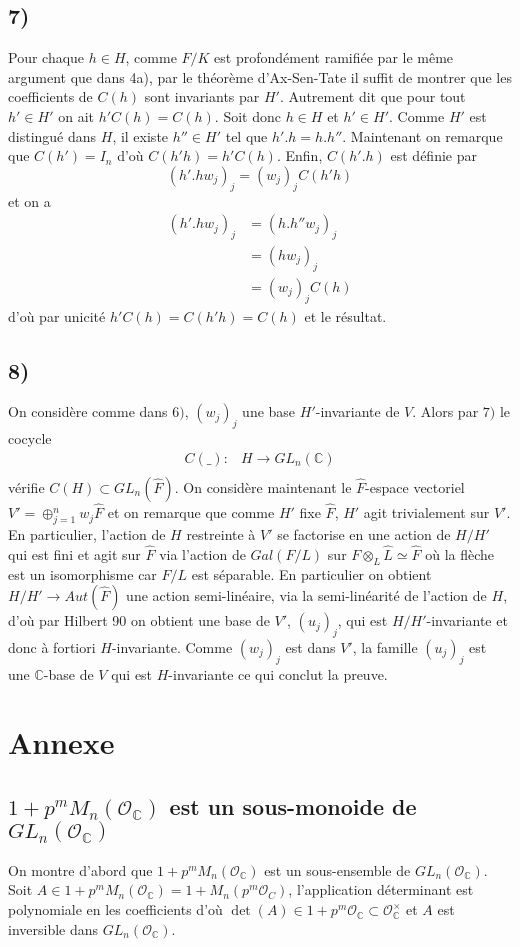 \documentclass[a4paper,12pt]{article}
\newcommand{\C}{\mathbb{C}}
\newcommand{\Or}{\mathcal{O}}
\theoremstyle{plain}
\theoremstyle{definition}
\theoremstyle{remark}
\begin{document}
\subsection*{7)}
Pour chaque $h\in H$, comme $F/K$ est profondément ramifiée par
le même argument que dans 4a), par le théorème d'Ax-Sen-Tate il
suffit de 
montrer que les coefficients de $C(h)$ sont invariants par $H'$.
Autrement dit que pour tout $h'\in H'$ on ait $h'C(h)=C(h)$. 
Soit donc $h\in H$ et $h'\in H'$. Comme $H'$ est distingué dans
$H$, il existe $h''\in H'$ tel que $h'.h=h.h''$. Maintenant
on remarque que $C(h')=I_n$ d'où $C(h'h)=h'C(h)$. Enfin,
$C(h'.h)$ est définie par 
\[(h'.hw_j)_j=(w_j)_jC(h'h)\]
et on a 
\begin{align*}
  (h'.hw_j)_j&=(h.h''w_j)_j\\
	     &=(hw_j)_j\\
	     &=(w_j)_jC(h)
\end{align*}
d'où par unicité $h'C(h)=C(h'h)=C(h)$ et le résultat.

\subsection*{8)}
On considère comme dans $6)$, $(w_j)_j$ une base $H'$-invariante 
de $V$. Alors par $7)$ le cocycle
\begin{align*}
  C(\_)\colon &H\to GL_n(\C)\\
\end{align*}
vérifie $C(H)\subset GL_n(\hat F)$. On considère maintenant 
le $\widehat F$-espace vectoriel $V'=\oplus_{j=1}^nw_j\widehat F$
et on remarque que comme $H'$ fixe $\widehat F$, $H'$ agit
trivialement sur $V'$. En particulier, l'action de $H$ restreinte
à $V'$ se factorise en une action de $H/H'$ qui est fini et agit
sur $\widehat F$ via l'action de $Gal(F/L)$ sur 
$F\otimes_L \widehat L\simeq \widehat F$ où la flèche est un
isomorphisme car $F/L$ est séparable. En particulier on obtient
$H/H'\to Aut(\widehat F)$ une action semi-linéaire, via la 
semi-linéarité de l'action de $H$, d'où par Hilbert 90 on obtient
une base de $V'$, $(u_j)_j$, qui est $H/H'$-invariante et donc à
fortiori $H$-invariante. Comme $(w_j)_j$ est dans $V'$, la famille
$(u_j)_j$ est une $\C$-base de $V$ qui est $H$-invariante ce qui
conclut la preuve.


\section*{Annexe}
\subsection{$1+p^mM_n(\Or_\C)$ est un sous-monoide de $GL_n(\Or_\C)$}
On montre d'abord que $1+p^mM_n(\Or_\C)$ est un sous-ensemble
de $GL_n(\Or_\C)$. Soit $A\in 1+p^mM_n(\Or_\C)=1+M_n(p^m\Or_C)$,
l'application déterminant est polynomiale en les coefficients d'où
$\det(A)\in 1+p^m\Or_\C\subset \Or_\C^\times$ et $A$ est 
inversible dans $GL_n(\Or_\C)$.
\end{document}
